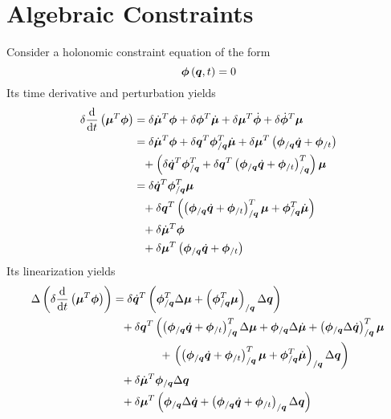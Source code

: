 \documentclass[10pt,fleqn,subeqn]{report}
\newcommand{\T}[1]{\bm{#1}}
\begin{document}
\section{Algebraic Constraints}
Consider a holonomic constraint equation of the form
\begin{equation}
	\T{\phi}\plbr{\T{q}, t} = 0 
\end{equation}
Its time derivative and perturbation yields
\begin{align}
	\delta\frac{\llk{d}}{\llk{d}t}\plbr{\T{\mu}^T\T{\phi}} &=
		\delta\dot{\T{\mu}}^T \T{\phi}
		+ \delta\T{\phi}^T \dot{\T{\mu}}
		+ \delta\T{\mu}^T \dot{\T{\phi}}
		+ \delta\dot{\T{\phi}}^T \T{\mu} \nonumber \\
	&= \delta\dot{\T{\mu}}^T \T{\phi}
		+ \delta\T{q}^T \T{\phi}_{/\T{q}}^T \dot{\T{\mu}}
		+ \delta\T{\mu}^T\plbr{
			\T{\phi}_{/\T{q}} \dot{\T{q}}
			+ \T{\phi}_{/t}
		} \nonumber \\
	&\hphantom{=} + \plbr{
			\delta\dot{\T{q}}^T \T{\phi}_{/\T{q}}^T
			+ \delta\T{q}^T \plbr{
				\T{\phi}_{/\T{q}} \dot{\T{q}}
				+ \T{\phi}_{/t}
			}_{/\T{q}}^T
		} \T{\mu} \nonumber \\
	&= \delta\dot{\T{q}}^T \T{\phi}_{/\T{q}}^T \T{\mu} \nonumber \\
	&\hphantom{=} + \delta\T{q}^T \plbr{
		\plbr{
			\T{\phi}_{/\T{q}} \dot{\T{q}}
			+ \T{\phi}_{/t}
		}_{/\T{q}}^T \T{\mu}
		+ \T{\phi}_{/\T{q}}^T \dot{\T{\mu}}
	} \nonumber \\
	&\hphantom{=} + \delta\dot{\T{\mu}}^T \T{\phi} \nonumber \\
	&\hphantom{=} + \delta\T{\mu}^T \plbr{
		\T{\phi}_{/\T{q}} \dot{\T{q}}
		+ \T{\phi}_{/t}
	}
\end{align}
Its linearization yields
\begin{align}
	\Delta\plbr{\delta\frac{\llk{d}}{\llk{d}t}\plbr{\T{\mu}^T\T{\phi}}}
	&= \delta\dot{\T{q}}^T \plbr{
		\T{\phi}_{/\T{q}}^T \Delta\T{\mu}
		+ \plbr{\T{\phi}_{/\T{q}}^T \T{\mu}}_{/\T{q}} \Delta\T{q}
	} \nonumber \\
	&\hphantom{=} + \delta\T{q}^T \lplbr{
		\plbr{
			\T{\phi}_{/\T{q}} \dot{\T{q}}
			+ \T{\phi}_{/t}
		}_{/\T{q}}^T \Delta \T{\mu}
		+ \T{\phi}_{/\T{q}} \Delta\dot{\T{\mu}}
		+ \plbr{\T{\phi}_{/\T{q}} \Delta\dot{\T{q}}}_{/\T{q}}^T \T{\mu}
	} \nonumber \\
	&\hphantom{=}\hspace{12mm} + \rplbr{
		\plbr{
			\plbr{
				\T{\phi}_{/\T{q}} \dot{\T{q}}
				+ \T{\phi}_{/t}
			}_{/\T{q}}^T \T{\mu}
			+ \T{\phi}_{/\T{q}}^T \dot{\T{\mu}}
		}_{/\T{q}} \Delta\T{q}
	} \nonumber \\
	&\hphantom{=} + \delta\dot{\T{\mu}}^T \T{\phi}_{/\T{q}} \Delta\T{q} \nonumber \\
	&\hphantom{=} + \delta\T{\mu}^T \plbr{
		\T{\phi}_{/\T{q}} \Delta\dot{\T{q}}
		+ \plbr{
			\T{\phi}_{/\T{q}} \dot{\T{q}}
			+ \T{\phi}_{/t}
		}_{/\T{q}} \Delta\T{q}
	}
\end{align}
\end{document}
